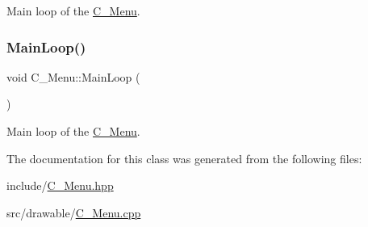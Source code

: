 Main loop of the \hyperlink{classC__Menu}{C\+\_\+\+Menu}. 

\mbox{\label{classC__Menu_a9529be708fad2c6deca21034bc37f59d}} 
\subsubsection{\texorpdfstring{Main\+Loop()}{MainLoop()}\hspace{0.1cm}{\footnotesize\ttfamily [2/2]}}
{\footnotesize\ttfamily void C\+\_\+\+Menu\+::\+Main\+Loop (\begin{DoxyParamCaption}{ }\end{DoxyParamCaption})}



Main loop of the \hyperlink{classC__Menu}{C\+\_\+\+Menu}. 



The documentation for this class was generated from the following files\+:\begin{DoxyCompactItemize}
\item 
include/\hyperlink{C__Menu_8hpp}{C\+\_\+\+Menu.\+hpp}\item 
src/drawable/\hyperlink{C__Menu_8cpp}{C\+\_\+\+Menu.\+cpp}\end{DoxyCompactItemize}
